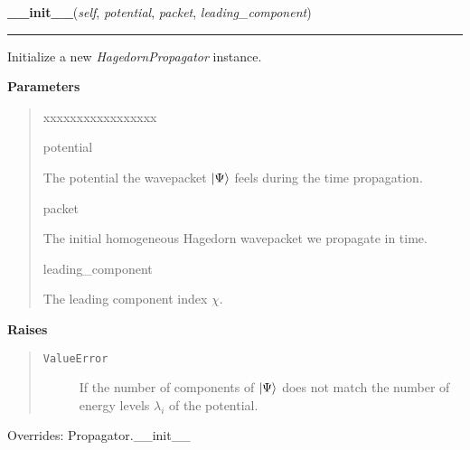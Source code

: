 \hspace{.8\funcindent}\begin{boxedminipage}{\funcwidth}

    \raggedright \textbf{\_\_init\_\_}(\textit{self}, \textit{potential}, \textit{packet}, \textit{leading\_component})

    \vspace{-1.5ex}

    \rule{\textwidth}{0.5\fboxrule}
\setlength{\parskip}{2ex}
    Initialize a new \textit{HagedornPropagator} instance.

\setlength{\parskip}{1ex}
      \textbf{Parameters}
      \vspace{-1ex}

      \begin{quote}
        \begin{Ventry}{xxxxxxxxxxxxxxxxx}

          \item[potential]

          The potential the wavepacket
          $\Ket{\Psi}$ feels during the
          time propagation.

          \item[packet]

          The initial homogeneous Hagedorn wavepacket we propagate in time.

          \item[leading\_component]

          The leading component index $\chi$.

        \end{Ventry}

      \end{quote}

      \textbf{Raises}
    \vspace{-1ex}

      \begin{quote}
        \begin{description}

          \item[\texttt{ValueError}]

          If the number of components of
          $\Ket{\Psi}$ does not match the
          number of energy levels $\lambda_i$ of the
          potential.

        \end{description}

      \end{quote}

      Overrides: Propagator.\_\_init\_\_

    \end{boxedminipage}

